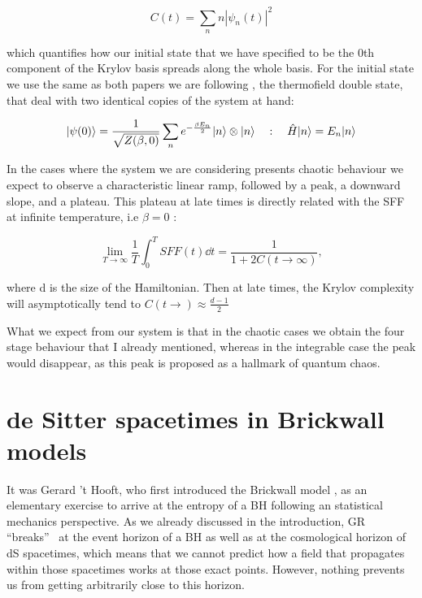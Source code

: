 \documentclass[11pt,a4paper]{article}
\begin{document}
\begin{equation}
    C(t)=\sum_n n\left|\psi_n(t)\right|^2
\end{equation}

which quantifies how our initial state that we have specified to be the 0th component of the Krylov basis spreads along the whole basis. For the initial state we use the same as both papers we are following \cite{Jeong_2025,Balasubramanian_2022}, the thermofield double state, that deal with two identical copies of the system at hand:

\begin{equation}
    \lvert\psi(0)\rangle = \frac{1}{\sqrt{Z(\beta,0)}}\sum_n e^{-\frac{\beta E_n}{2}} \lvert n\rangle\otimes\lvert n\rangle ~~~:~~~ \hat{H} \lvert n\rangle = E_n\lvert n\rangle
\end{equation}

In the cases where the system we are considering presents chaotic behaviour we expect to observe a characteristic linear ramp, followed by a peak, a downward slope, and a plateau. This plateau at late times is directly related with the SFF at infinite temperature, i.e $\beta=0$ \cite{Erdmenger_2023}:

\begin{equation}
    \lim_{T\rightarrow\infty}\frac{1}{T}\int_0^T SFF(t)\dd t = \frac{1}{1+2C(t\rightarrow\infty)},
\end{equation}

{\noindent where d is the size of the Hamiltonian. Then at late times, the Krylov complexity will asymptotically tend to $C(t\rightarrow)\approx\frac{d-1}{2}$}

What we expect from our system is that in the chaotic cases we obtain the four stage behaviour that I already mentioned, whereas in the integrable case the peak would disappear, as this peak is proposed as a hallmark of quantum chaos.

%    

\section{de Sitter spacetimes in Brickwall models}

It was Gerard 't Hooft, who first introduced the Brickwall model \cite{tHooft:1984kcu}, as an elementary exercise to arrive at the entropy of a BH following an statistical mechanics perspective. As we already discussed in the introduction, GR \textquotedblleft breaks\textquotedblright~  at the event horizon of a BH as well as at the cosmological horizon of dS spacetimes, which means that we cannot predict how a field that propagates within those spacetimes works at those exact points. However, nothing prevents us from getting arbitrarily close to this horizon.
\end{document}
